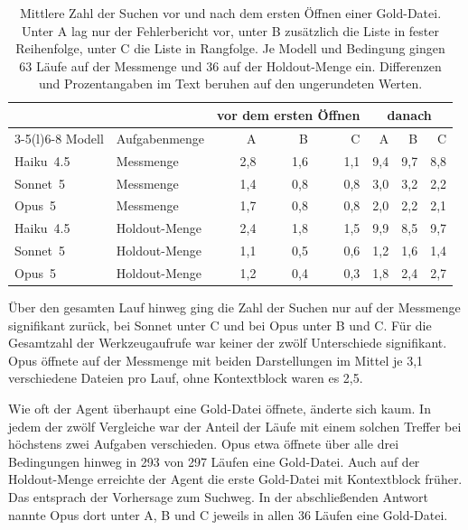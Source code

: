 \begin{ungelesen}
{\begin{table}[H]
  \centering
  \caption{Mittlere Zahl der Suchen vor und nach dem ersten Öffnen einer Gold-Datei. Unter A lag nur der Fehlerbericht vor, unter B zusätzlich die Liste in fester Reihenfolge, unter C die Liste in Rangfolge. Je Modell und Bedingung gingen 63 Läufe auf der Messmenge und 36 auf der Holdout-Menge ein. Differenzen und Prozentangaben im Text beruhen auf den ungerundeten Werten.}
  \label{tab:suchen-vor-nach}
  \footnotesize
  \begin{tabular}{@{}llrrrrrr@{}}
    \toprule
    & & \multicolumn{3}{c}{vor dem ersten Öffnen} & \multicolumn{3}{c}{danach} \\
    \cmidrule(lr){3-5}\cmidrule(l){6-8}
    Modell & Aufgabenmenge & A & B & C & A & B & C \\
    \midrule
    Haiku~4.5 & Messmenge & 2,8 & 1,6 & 1,1 & 9,4 & 9,7 & 8,8 \\
    Sonnet~5 & Messmenge & 1,4 & 0,8 & 0,8 & 3,0 & 3,2 & 2,2 \\
    Opus~5 & Messmenge & 1,7 & 0,8 & 0,8 & 2,0 & 2,2 & 2,1 \\
    Haiku~4.5 & Holdout-Menge & 2,4 & 1,8 & 1,5 & 9,9 & 8,5 & 9,7 \\
    Sonnet~5 & Holdout-Menge & 1,1 & 0,5 & 0,6 & 1,2 & 1,6 & 1,4 \\
    Opus~5 & Holdout-Menge & 1,2 & 0,4 & 0,3 & 1,8 & 2,4 & 2,7 \\
    \bottomrule
  \end{tabular}
\end{table}

Über den gesamten Lauf hinweg ging die Zahl der Suchen nur auf der Messmenge signifikant zurück, bei Sonnet unter C und bei Opus unter B und C. Für die Gesamtzahl der Werkzeugaufrufe war keiner der zwölf Unterschiede signifikant. Opus öffnete auf der Messmenge mit beiden Darstellungen im Mittel je 3,1 verschiedene Dateien pro Lauf, ohne Kontextblock waren es 2,5.

Wie oft der Agent überhaupt eine Gold-Datei öffnete, änderte sich kaum. In jedem der zwölf Vergleiche war der Anteil der Läufe mit einem solchen Treffer bei höchstens zwei Aufgaben verschieden. Opus etwa öffnete über alle drei Bedingungen hinweg in 293 von 297 Läufen eine Gold-Datei. Auch auf der Holdout-Menge erreichte der Agent die erste Gold-Datei mit Kontextblock früher. Das entsprach der Vorhersage zum Suchweg. In der abschließenden Antwort nannte Opus dort unter A, B und C jeweils in allen 36 Läufen eine Gold-Datei.

}
\end{ungelesen}
